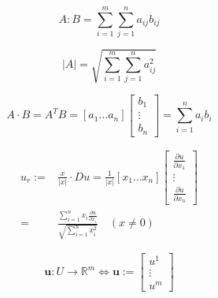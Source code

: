 \documentclass{article}
\begin{document}
\begin{definition}[$A:B$]
    \begin{equation}
        \label{eq:A:B}
        A : B = \sum_{i=1}^{m}\sum_{j=1}^{n}a_{ij}b_{ij}
    \end{equation}
\end{definition}

\begin{definition}[$|A|$]
    \begin{equation}
        \label{eq:|A|}
        |A| = \sqrt{\sum_{i=1}^{m}\sum_{j=1}^{n} a_{ij}^{2}}
    \end{equation}
\end{definition}

\begin{definition}
    \begin{equation}
        A \cdot B = A^{T} B =
        [a_{1} \dots a_{n}]
        \begin{bmatrix}
            b_{1} \\ \vdots \\ b_{n}
        \end{bmatrix}
        = \sum_{i=1}^{n} a_{i}b_{i}
    \end{equation}
\end{definition}

\begin{definition}
    \begin{equation}
        \label{eq:radial-derivative}
        \begin{aligned}
            u_{r} := & \frac{x}{|x|} \cdot Du
            = \frac{1}{|x|} [x_{1} \dots x_{n}]
            \begin{bmatrix}
                \frac{\partial u}{\partial x_{1}} \\
                \vdots                            \\
                \frac{\partial u}{\partial x_{n}}
            \end{bmatrix}                                               \\
            =        & \frac{\sum_{i=1}^{n} x_{i}\frac{\partial u}{\partial x_{i}}}{\sqrt{\sum_{i=1}^{n} x_{i}^{2}}}
            \quad (x \neq 0)
        \end{aligned}
    \end{equation}
\end{definition}

\begin{definition}[$\boldsymbol{u}$]
    \begin{equation}
        \label{eq:us}
        \boldsymbol{u} : U \to \mathbb{R}^{m} \Leftrightarrow \boldsymbol{u} :=
        \begin{bmatrix}
            u^{1} \\ \vdots \\ u^{m}
        \end{bmatrix}
    \end{equation}
\end{definition}
\end{document}

